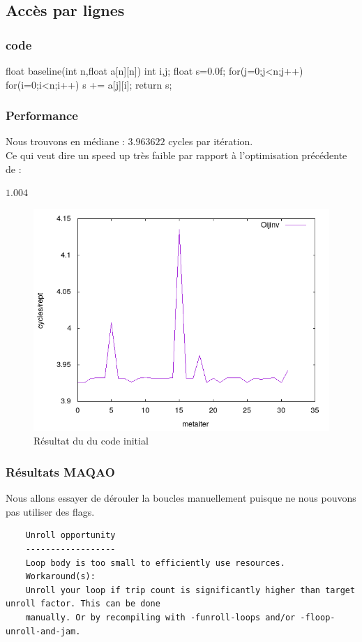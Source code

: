 \documentclass{report}
\begin{document}
  \subsection{Accès par lignes}
  \subsubsection{code}
  \begin{cc}
    float baseline(int n,float a[n][n])
    {
        int i,j;
        float s=0.0f;
        for(j=0;j<n;j++)
            for(i=0;i<n;i++)
                s += a[j][i];
        return s;
    }
  \end{cc}
  \subsubsection{Performance}
  Nous trouvons en médiane : $3.963622$ cycles par itération.\\
  Ce qui veut dire un speed up très faible par rapport à l'optimisation précédente de :
  \begin{center}
      $1.004$
  \end{center}
  \begin{figure}[ht!]
    \centering
    \includegraphics[scale=0.45]{../metarep/Oijinv.png}
    \caption{Résultat du du code initial}
  \end{figure}
  \subsubsection{Résultats MAQAO}
  Nous allons essayer de dérouler la boucles manuellement puisque ne nous pouvons pas utiliser
  des flags.
  \begin{verbatim}
    Unroll opportunity
    ------------------
    Loop body is too small to efficiently use resources.
    Workaround(s):
    Unroll your loop if trip count is significantly higher than target unroll factor. This can be done
    manually. Or by recompiling with -funroll-loops and/or -floop-unroll-and-jam.
  \end{verbatim}
\end{document}
